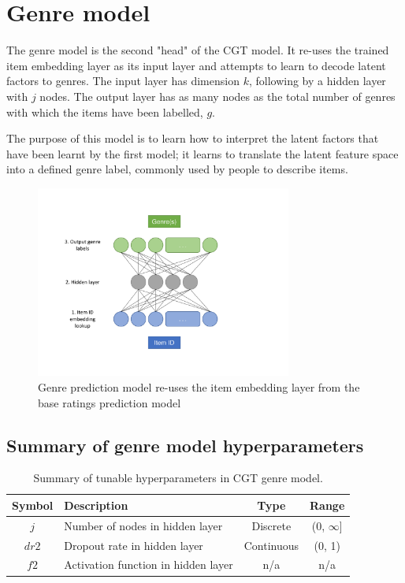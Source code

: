 \section{Genre model}
The genre model is the second "head" of the CGT model. It re-uses the trained item embedding layer as its input layer and attempts to learn to decode latent factors to genres. The input layer has dimension $k$, following by a hidden layer with $j$ nodes. The output layer has as many nodes as the total number of genres with which the items have been labelled, $g$.

The purpose of this model is to learn how to interpret the latent factors that have been learnt by the first model; it learns to translate the latent feature space into a defined genre label, commonly used by people to describe items.

\begin{figure}[H]
\centering
\includegraphics[width=0.75\textwidth]{Figures/4_genre-model.pdf}
\decoRule
\caption[Genre prediction model]{Genre prediction model re-uses the item embedding layer from the base ratings prediction model}
\label{fig:4_genre-prediction-architecture}
\end{figure}

\subsection{Summary of genre model hyperparameters}
\begin{table}[H]
\centering
\begin{tabular}{c | p{3.5cm} | c | c}
\toprule
\textbf{Symbol} & \textbf{Description} & \textbf{Type} & \textbf{Range} \\
\midrule
$j$ & Number of nodes in hidden layer & Discrete & (0, $\infty$] \\
\midrule
$dr2$ & Dropout rate in hidden layer & Continuous & (0, 1) \\
\midrule
$f2$ & Activation function in hidden layer & n/a & n/a \\
\bottomrule
\end{tabular}
\caption[Genre model hyperparameters]{Summary of tunable hyperparameters in CGT genre model.}
\label{tab:genre-hparams}
\end{table}

